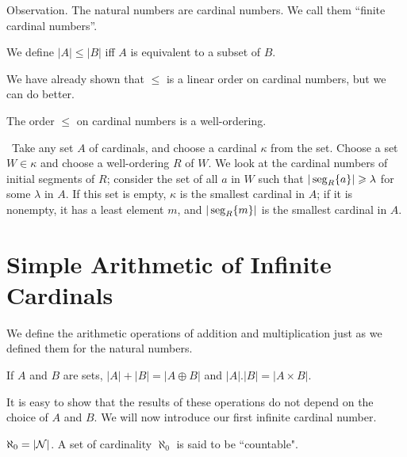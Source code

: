 \begin{ThmEtc}{Observation.}
 The natural numbers are cardinal numbers.  We call them
 ``finite cardinal numbers''.
\end{ThmEtc}

\begin{definition}
 We define $|A| \leq |B|$ iff $A$ is equivalent to a subset of $B$.
\end{definition}

We have already shown that $\leq$ is a linear order on cardinal
numbers, but we can do better.

\begin{thm}
 The order $\leq$ on cardinal numbers is a well-ordering.
\end{thm}

\preuve\ Take any set $A$ of cardinals, and choose a cardinal
$\kappa$ from the set.  Choose a set $W \in \kappa$ and choose a
well-ordering $R$ of $W$.  We look at the cardinal numbers of
initial segments of $R$; consider the set of all $a$ in $W$ such
that $|\mathop{\mathrm{seg}}_R\{a\}| \geqslant \lambda$ for some $\lambda$ in $A$.  If
this set is empty, $\kappa$ is the smallest cardinal in $A$; if it
is nonempty, it has a least element $m$, and $|\mathop{\mathrm{seg}}_R\{m\}|$ is the
smallest cardinal in $A$.
\finpreuve


\section{Simple Arithmetic of Infinite Cardinals}

We define the arithmetic operations of addition
and multiplication just as we defined them
for the natural numbers.

\begin{definition}
 If $A$ and $B$ are sets, $|A| + |B| = |A \oplus B|$ and $|A|.|B| =
 |A \times B|$.
\end{definition}

It is easy to show that the results of these operations do not
depend on the choice of $A$ and $B$.  We will now introduce our first
infinite cardinal number.

\begin{definition}
 $\aleph_0 = |{\cal N}|$.  A set of cardinality $\aleph_0$ is
 said to be ``countable".
\end{definition}

